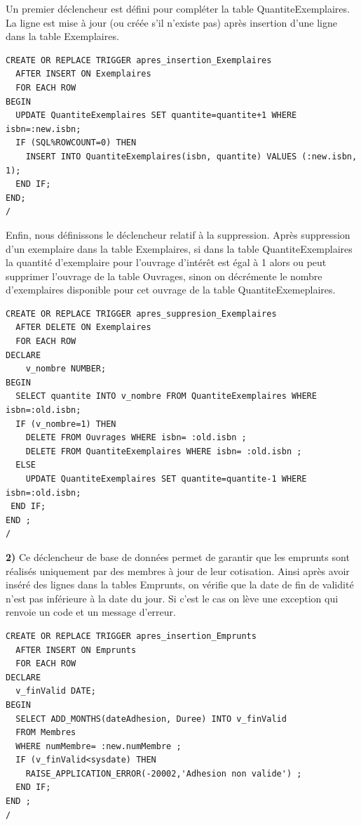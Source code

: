 \documentclass[a4paper,12pt]{article}
\begin{document}
Un premier déclencheur est défini pour compléter la table QuantiteExemplaires. La ligne est mise à jour (ou créée s'il n'existe pas) après insertion d'une ligne dans la table Exemplaires.

\begin{lstlisting}
CREATE OR REPLACE TRIGGER apres_insertion_Exemplaires
  AFTER INSERT ON Exemplaires
  FOR EACH ROW
BEGIN
  UPDATE QuantiteExemplaires SET quantite=quantite+1 WHERE isbn=:new.isbn;
  IF (SQL%ROWCOUNT=0) THEN
    INSERT INTO QuantiteExemplaires(isbn, quantite) VALUES (:new.isbn, 1);
  END IF;
END;
/
\end{lstlisting}

Enfin, nous définissons le déclencheur relatif à la suppression. Après suppression d'un exemplaire dans la table Exemplaires, si dans la table QuantiteExemplaires la quantité d'exemplaire pour l'ouvrage d'intérêt est égal à 1 alors ou peut supprimer l'ouvrage de la table Ouvrages, sinon on décrémente le nombre d'exemplaires disponible pour cet ouvrage de la table QuantiteExemeplaires.

\begin{lstlisting}
CREATE OR REPLACE TRIGGER apres_suppresion_Exemplaires 
  AFTER DELETE ON Exemplaires 
  FOR EACH ROW
DECLARE
	v_nombre NUMBER;
BEGIN
  SELECT quantite INTO v_nombre FROM QuantiteExemplaires WHERE isbn=:old.isbn;
  IF (v_nombre=1) THEN
    DELETE FROM Ouvrages WHERE isbn= :old.isbn ;
	DELETE FROM QuantiteExemplaires WHERE isbn= :old.isbn ;
  ELSE
    UPDATE QuantiteExemplaires SET quantite=quantite-1 WHERE isbn=:old.isbn;
 END IF;
END ;
/
\end{lstlisting}

\textbf {2)}  Ce déclencheur de base de données permet de garantir que les emprunts sont réalisés uniquement par des membres à jour de leur cotisation. Ainsi après avoir inséré des lignes dans la tables Emprunts, on vérifie que la date de fin de validité n'est pas inférieure à la date du jour. Si c'est le cas on lève une exception qui renvoie un code et un message d'erreur.
 
\begin{lstlisting}
CREATE OR REPLACE TRIGGER apres_insertion_Emprunts
  AFTER INSERT ON Emprunts
  FOR EACH ROW
DECLARE
  v_finValid DATE;
BEGIN
  SELECT ADD_MONTHS(dateAdhesion, Duree) INTO v_finValid
  FROM Membres
  WHERE numMembre= :new.numMembre ;
  IF (v_finValid<sysdate) THEN
    RAISE_APPLICATION_ERROR(-20002,'Adhesion non valide') ;
  END IF;
END ;
/
\end{lstlisting}
\clearpage
\end{document}
